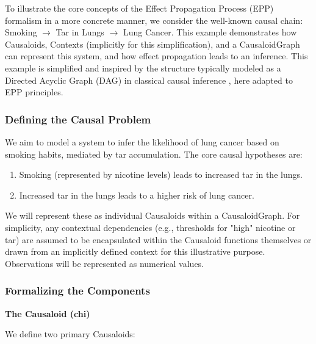 To illustrate the core concepts of the Effect Propagation Process (EPP) formalism in a more concrete manner, we consider the well-known causal chain: Smoking \(\rightarrow\) Tar in Lungs \(\rightarrow\) Lung Cancer. This example demonstrates how Causaloids, Contexts (implicitly for this simplification), and a CausaloidGraph can represent this system, and how effect propagation leads to an inference. This example is simplified and inspired by the structure typically modeled as a Directed Acyclic Graph (DAG) in classical causal inference \cite{pearl2000causality}, here adapted to EPP principles.

    \subsubsection{Defining the Causal Problem}
    \label{ssec:example_problem_definition}
    We aim to model a system to infer the likelihood of lung cancer based on smoking habits, mediated by tar accumulation. The core causal hypotheses are:
    \begin{enumerate}
        \item Smoking (represented by nicotine levels) leads to increased tar in the lungs.
        \item Increased tar in the lungs leads to a higher risk of lung cancer.
    \end{enumerate}
    We will represent these as individual Causaloids within a CausaloidGraph. For simplicity, any contextual dependencies (e.g., thresholds for "high" nicotine or tar) are assumed to be encapsulated within the Causaloid functions themselves or drawn from an implicitly defined context for this illustrative purpose. Observations will be represented as numerical values.

    \subsubsection{Formalizing the Components}
    \label{ssec:example_formal_components}

\textbf{The Causaloid (chi)}
        
        We define two primary Causaloids:

